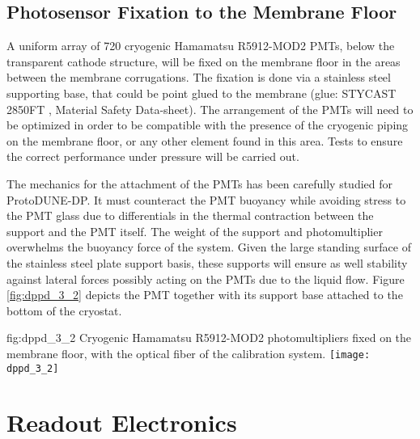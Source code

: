 \subsection{Photosensor Fixation to the Membrane Floor}
\label{sec:fddp-pd-3.2}

A uniform array of 720 cryogenic Hamamatsu R5912-MOD2 PMTs, below the transparent cathode structure, will be fixed on the membrane floor in the areas between the membrane corrugations. The fixation is done via a stainless steel supporting base, that could be point glued to the membrane (glue: STYCAST 2850FT \cite{sytcast}, Material Safety Data-sheet). The arrangement of the PMTs will need to be optimized in order to be compatible with the presence of the cryogenic piping on the membrane floor, or any other element found in this area. Tests to ensure the correct performance under pressure will be carried out.

The mechanics for the attachment of the PMTs has been carefully studied for ProtoDUNE-DP. It must counteract the PMT buoyancy while avoiding stress to the PMT glass due to differentials in the thermal contraction between the support and the PMT itself. The weight of the support and photomultiplier overwhelms the buoyancy force of the system. Given the large standing surface of the stainless steel plate support basis, these supports will ensure as well stability against lateral forces possibly acting on the PMTs due to the liquid flow. Figure \ref{fig:dppd_3_2} depicts the PMT together with its support base attached to the bottom of the cryostat. %

\begin{dunefigure}{fig:dppd_3_2}
{Cryogenic Hamamatsu R5912-MOD2 photomultipliers fixed on the membrane floor, with the optical fiber of the calibration system.}
\texttt{[image: dppd\_3\_2]}
\end{dunefigure}

\section{Readout Electronics}
\label{sec:fddp-pd-4}

